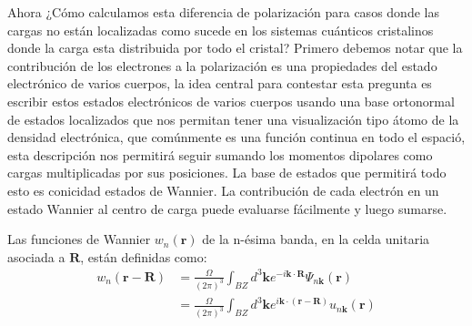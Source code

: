 Ahora ¿Cómo calculamos esta diferencia de polarización para casos donde las cargas no están localizadas como sucede en los sistemas cuánticos cristalinos donde la carga esta distribuida por todo el cristal? Primero debemos notar que la contribución de los electrones a la polarización es una propiedades del estado electrónico de varios cuerpos, la idea central para contestar esta pregunta es escribir estos estados electrónicos de varios cuerpos usando una base ortonormal  de estados localizados que nos permitan tener una visualización tipo átomo de la densidad electrónica, que comúnmente es una función continua en todo el espació, esta descripción nos permitirá seguir sumando los momentos dipolares como cargas multiplicadas por sus posiciones. La base de estados que permitirá todo esto es conicidad estados de Wannier. La contribución de cada electrón en un estado Wannier al centro de carga puede evaluarse fácilmente y luego sumarse.

Las funciones de Wannier $w_n(\textbf{r})$ de la n-ésima banda, en la celda unitaria asociada a $\textbf{R}$, están definidas como:
\begin{equation}
\begin{split}
     w_n(\textbf{r} - \textbf{R}) &= \frac{\Omega}{(2\pi)^3} \int_{BZ} d^3\textbf{k} e^{-i \textbf{k} \cdot \textbf{R}} \Psi_{n\textbf{k}}(\textbf{r})\\
     &= \frac{\Omega}{(2\pi)^3} \int_{BZ} d^3\textbf{k} e^{i \textbf{k} \cdot (\textbf{r} - \textbf{R})} u_{n\textbf{k}}(\textbf{r})
\end{split}
\end{equation}


